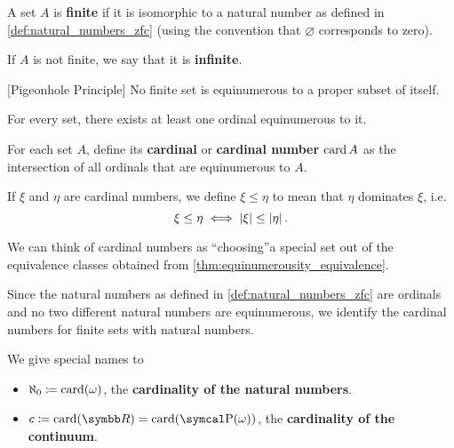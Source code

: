 \begin{definition}\label{def:finite_set}\cite[133]{Enderton1977}
  A set \( A \) is \textbf{finite} if it is isomorphic to a natural number as defined in \cref{def:natural_numbers_zfc} (using the convention that \( \varnothing \) corresponds to zero).

  If \( A \) is not finite, we say that it is \textbf{infinite}.
\end{definition}

\begin{theorem}\label{def:pigeonhole_principle}[Pigeonhole Principle]\cite[Corollary 6C]{Enderton1977}
  No finite set is equinumerous to a proper subset of itself.
\end{theorem}

\begin{theorem}\label{thm:equinumerous_ordinal_existence}\cite[197]{Enderton1977}
  For every set, there exists at least one ordinal equinumerous to it.
\end{theorem}

\begin{definition}\label{def:cardinal}\cite[197]{Enderton1977}
  For each set \( A \), define its \textbf{cardinal} or \textbf{cardinal number} \( \operatorname{card} A \) as the intersection of all ordinals that are equinumerous to \( A \).

  If \( \xi \) and \( \eta \) are cardinal numbers, we define \( \xi \leq \eta \) to mean that \( \eta \) dominates \( \xi \), i.e.
  \begin{equation*}
    \xi \leq \eta \iff \left\vert \xi \right\vert \leq \left\vert \eta \right\vert.
  \end{equation*}
\end{definition}

\begin{remark}\label{note:cardinals}
  We can think of cardinal numbers as \enquote{choosing}\AOC a special set out of the equivalence classes obtained from \cref{thm:equinumerousity_equivalence}.

  Since the natural numbers as defined in \cref{def:natural_numbers_zfc} are ordinals and no two different natural numbers are equinumerous, we identify the cardinal numbers for finite sets with natural numbers.

  We give special names to
  \begin{itemize}
    \item \( \aleph_0 \coloneqq \operatorname{card}(\omega) \), the \textbf{cardinality of the natural numbers}.
    \item \( c \coloneqq \Card(\BB{R}) = \Card(\Power(\omega)) \), the \textbf{cardinality of the continuum}.
  \end{itemize}
\end{remark}

